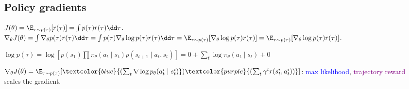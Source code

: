 \subsection*{Policy gradients}
\quad$J(\theta) = \E_{\tau \sim p(\tau)} [r(\tau)]
= \int p(\tau) r(\tau) \dd \tau$.
$\nabla_\theta J(\theta) = \int \nabla_\theta p(\tau) r(\tau) \dd \tau
= \int p(\tau) \nabla_\theta \log p(\tau) r(\tau) \dd \tau
= \E_{\tau \sim p(\tau)} [\nabla_\theta \log p(\tau) r(\tau)] = \E_{\tau \sim p(\tau)}[\nabla_\theta \log p(\tau) r(\tau)]$.

$\log p(\tau) = \log[p(s_1)\prod \pi_\theta(a_t \mid s_t) p(s_{t+1} \mid a_t, s_t)]
= 0 + \sum_t \log \pi_\theta(a_t \mid s_t) + 0$

$\nabla_\theta J(\theta) = \E_{\tau \sim p(\tau)}
[\textcolor{blue}{(\sum_t \nabla \log p_\theta(a_t^i \mid s_t^i)})\textcolor{purple}{(\sum_t \gamma^t r(s_t^i, a_t^i))}]$:
\textcolor{blue}{max likelihood}, \textcolor{purple}{trajectory reward} scales the gradient.
